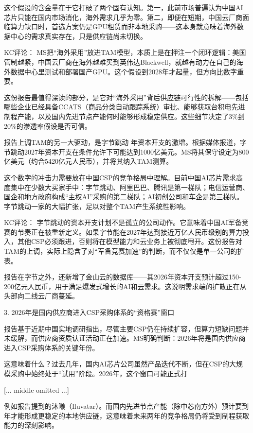 \documentclass[11pt]{ctexart}
\begin{document}
这个假设的含金量在于它打破了两个固有认知。第一，此前市场普遍认为中国AI芯片只能在国内市场消化，海外需求几乎为零。第二，即便在短期，中国云厂商面临算力缺口时，首选方案仍是GPU租赁而非本地采购——这本身就意味着海外数据中心的需求真实存在，只是供应链尚未切换。

KC评论： MS把“海外采用”放进TAM模型，本质上是在押注一个闭环逻辑：美国管制越紧，中国云厂商在海外越难买到英伟达Blackwell，就越有动力在自己的海外数据中心里测试和部署国产GPU。这个假设到2028年才起量，但方向比数字重要。

这份报告最值得深读的部分，是它对“海外采用”背后供应链可行性的拆解——包括哪些企业已经具备CCATS（商品分类自动跟踪系统）审批、能够获取台积电先进制程产能，以及国内先进节点产能何时能够形成稳定供应。这些细节决定了3\%到20\%的渗透率假设是否可信。

报告上调TAM的另一大驱动，是字节跳动 年资本开支的激增。根据媒体报道，字节跳动2027年资本开支在条件允许下可能达到1000亿美元。MS将其保守设定为800亿美元（约合5420亿元人民币），并将其纳入TAM测算。

这个数字的冲击力需要放在中国CSP的竞争格局中理解。目前中国AI芯片需求高度集中在少数大买家手中：字节跳动、阿里巴巴、腾讯是第一梯队；电信运营商、国企和地方政府构成“主权AI”采购的第二梯队；AI初创公司和车企是第三梯队。字节跳动一家的大幅扩张，足以对整个TAM产生系统性影响。

KC评论： 字节跳动的资本开支计划不是孤立的公司动作。它意味着中国AI军备竞赛的节奏正在被重新定义。如果字节能在2027年达到接近万亿人民币级别的算力投入，其他CSP必须跟进，否则将在模型能力和云业务上被彻底甩开。这份报告对TAM的上调，实际上隐含了对“军备竞赛加速”的判断，而不仅仅是单一公司的扩表。

报告在字节之外，还新增了金山云的数据库——其2026年资本开支预计超过150-200亿元人民币，用于满足爆发式增长的AI和云需求。这说明需求端的扩散正在从头部向二线云厂商蔓延。

3. 2026年是国内供应商进入CSP采购体系的“资格赛”窗口

报告基于近期中国实地调研指出，尽管主要CSP仍在持续扩容，但算力短缺问题并未缓解，而供应商资质认证活动正在加速。MS明确判断：2026年将是国内供应商进入CSP采购体系的关键年份。

这意味着什么？过去几年，国内AI芯片公司虽然产品迭代不断，但在CSP的大规模采购中始终处于“试用”阶段。2026年，这个窗口可能正式打

[... middle omitted ...]

例如报告提到的沐曦（Iluvatar）。而国内先进节点产能（除中芯南方外）预计要到 年才能形成更稳定的本地供应链，这意味着未来两年的竞争格局仍将受到制程获取能力的深刻影响。
\end{document}
